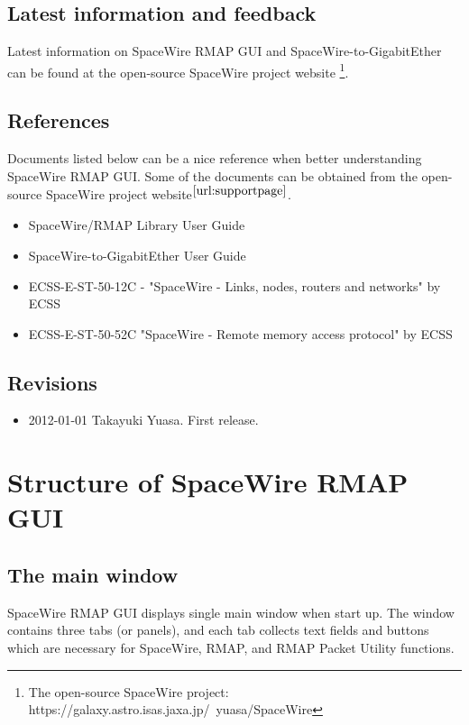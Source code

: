 \documentclass[a4paper,10pt]{article}
\begin{document}
\subsection{Latest information and feedback}
Latest information on SpaceWire RMAP GUI and SpaceWire-to-GigabitEther can be found at the open-source SpaceWire project website \footnote{The open-source SpaceWire project: https://galaxy.astro.isas.jaxa.jp/~yuasa/SpaceWire\label{url:supportpage}}.

\subsection{References}
Documents listed below can be a nice reference when better understanding SpaceWire RMAP GUI. Some of the documents can be obtained from the open-source SpaceWire project website$^\mathrm{\ref{url:supportpage}}$.
\begin{itemize}
  \setlength{\parskip}{0cm}
  \setlength{\itemsep}{0cm}
\item SpaceWire/RMAP Library User Guide
\item SpaceWire-to-GigabitEther User Guide
\item ECSS-E-ST-50-12C - "SpaceWire - Links, nodes, routers and networks" by ECSS
\item ECSS-E-ST-50-52C "SpaceWire - Remote memory access protocol" by ECSS
\end{itemize}

\subsection{Revisions}
\begin{itemize}
  \setlength{\parskip}{0cm}
  \setlength{\itemsep}{0cm}
\item 2012-01-01 Takayuki Yuasa. First release.
\end{itemize}



\section{Structure of SpaceWire RMAP GUI}

\subsection{The main window}
SpaceWire RMAP GUI displays single main window when start up.
The window contains three tabs (or panels), and each tab collects text fields and buttons which are necessary for SpaceWire, RMAP, and RMAP Packet Utility functions.
\end{document}
